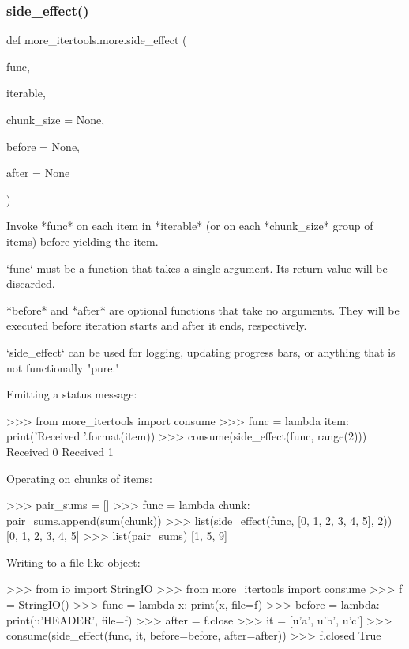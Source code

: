 \subsubsection{\texorpdfstring{side\+\_\+effect()}{side\_effect()}}
{\footnotesize\ttfamily def more\+\_\+itertools.\+more.\+side\+\_\+effect (\begin{DoxyParamCaption}\item[{}]{func,  }\item[{}]{iterable,  }\item[{}]{chunk\+\_\+size = {\ttfamily None},  }\item[{}]{before = {\ttfamily None},  }\item[{}]{after = {\ttfamily None} }\end{DoxyParamCaption})}

\begin{DoxyVerb}Invoke *func* on each item in *iterable* (or on each *chunk_size* group
of items) before yielding the item.

`func` must be a function that takes a single argument. Its return value
will be discarded.

*before* and *after* are optional functions that take no arguments. They
will be executed before iteration starts and after it ends, respectively.

`side_effect` can be used for logging, updating progress bars, or anything
that is not functionally "pure."

Emitting a status message:

    >>> from more_itertools import consume
    >>> func = lambda item: print('Received {}'.format(item))
    >>> consume(side_effect(func, range(2)))
    Received 0
    Received 1

Operating on chunks of items:

    >>> pair_sums = []
    >>> func = lambda chunk: pair_sums.append(sum(chunk))
    >>> list(side_effect(func, [0, 1, 2, 3, 4, 5], 2))
    [0, 1, 2, 3, 4, 5]
    >>> list(pair_sums)
    [1, 5, 9]

Writing to a file-like object:

    >>> from io import StringIO
    >>> from more_itertools import consume
    >>> f = StringIO()
    >>> func = lambda x: print(x, file=f)
    >>> before = lambda: print(u'HEADER', file=f)
    >>> after = f.close
    >>> it = [u'a', u'b', u'c']
    >>> consume(side_effect(func, it, before=before, after=after))
    >>> f.closed
    True\end{DoxyVerb}
 \mbox{\label{namespacemore__itertools_1_1more_a15147eb2896fda44f7e6a5c35ca2457d}} 
